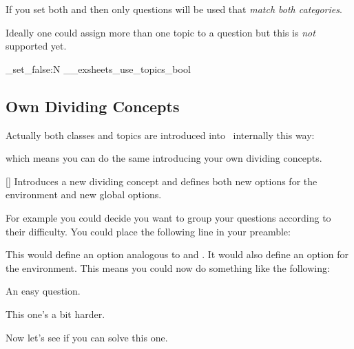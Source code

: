 \documentclass[load-preamble+]{cnltx-doc}
\begin{document}
If you set both  and  then only
questions will be used that \emph{match both categories}.

Ideally one could assign more than one topic to a question but this is
\emph{not} supported yet.

\ExplSyntaxOn
 \bool_set_false:N \g__exsheets_use_topics_bool
\ExplSyntaxOff

\subsection{Own Dividing Concepts}
Actually both classes and topics are introduced into
\ExSheets\ internally this way:
\begin{sourcecode}
\end{sourcecode}
which means you can do the same introducing your own dividing concepts.
\begin{commands}
  []
    Introduces a new dividing concept and defines both new options for the
     environment and new global options.
\end{commands}

For example you could decide you want to group your questions according to
their difficulty.  You could place the following line in your preamble:
\begin{sourcecode}
\end{sourcecode}
This would define an option  analogous to
 and .  It would also define an option
 for the  environment.  This means you could
now do something like the following:
\begin{example}
  \begin{question}[difficulty=easy]
    An easy question.
  \end{question}
  \begin{question}[difficulty=medium]
    This one's a bit harder.
  \end{question}
  \begin{question}[difficulty=hard]
    Now let's see if you can solve this one.
  \end{question}
\end{example}
\end{document}
